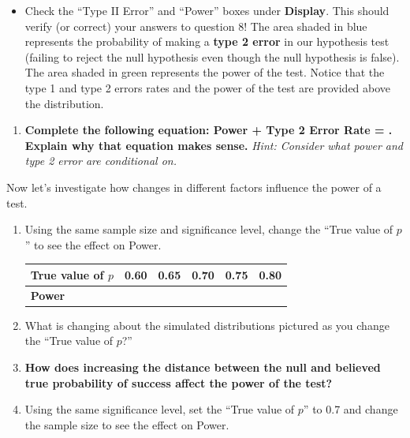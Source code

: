 \documentclass[
]{report}
\providecommand{\tightlist}{%
  \setlength{\itemsep}{0pt}\setlength{\parskip}{0pt}}
\begin{document}
\begin{itemize}
\tightlist
\item
  Check the ``Type II Error'' and ``Power'' boxes under \textbf{Display}. This should verify (or correct) your answers to question 8! The area shaded in blue represents the probability of making a \textbf{type 2 error} in our hypothesis test (failing to reject the null hypothesis even though the null hypothesis is false). The area shaded in green represents the power of the test. Notice that the type 1 and type 2 errors rates and the power of the test are provided above the distribution.
\end{itemize}

\begin{enumerate}
\def\labelenumi{\arabic{enumi}.}
\setcounter{enumi}{8}
\tightlist
\item
  \textbf{Complete the following equation: Power + Type 2 Error Rate = . Explain why that equation makes sense.} \emph{Hint: Consider what power and type 2 error are conditional on.}
  \vspace{0.8in}
\end{enumerate}

Now let's investigate how changes in different factors influence the power of a test.

\begin{enumerate}
\def\labelenumi{\arabic{enumi}.}
\setcounter{enumi}{9}
\item
  Using the same sample size and significance level, change the ``True value of \(p\)'' to see the effect on Power.
  \setlength\tabcolsep{0.5cm}

  \begin{longtable}{|l|c|c|c|c|c|}
  \hline
  \textbf{True value of $p$}& 0.60 & 0.65 & 0.70 & 0.75 & 0.80 \\ \hline
  \textbf{Power} & & & & &  \\ \hline
  \end{longtable}
\item
  What is changing about the simulated distributions pictured as you change the ``True value of \(p\)?''
  \vspace{0.5in}
\item
  \textbf{How does increasing the distance between the null and believed true probability of success affect the power of the test?}
  \vspace{0.5in}
\item
  Using the same significance level, set the ``True value of \(p\)'' to 0.7 and change the sample size to see the effect on Power.
\end{enumerate}
\end{document}
